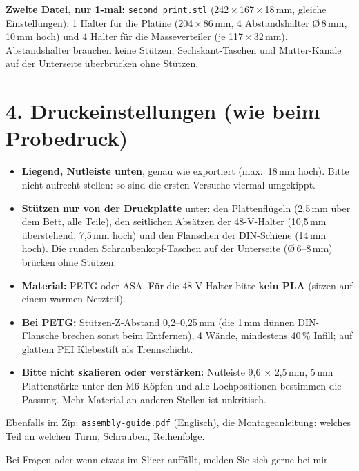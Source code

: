 \documentclass[10pt,a4paper]{article}
\begin{document}
\textbf{Zweite Datei, nur 1-mal:} \texttt{second\_print.stl} (242\,$\times$\,167\,$\times$\,18\,mm, gleiche Einstellungen):
1 Halter für die Platine (204\,$\times$\,86\,mm, 4 Abstandshalter Ø\,8\,mm, 10\,mm hoch) und 4 Halter für die Masseverteiler
(je 117\,$\times$\,32\,mm). Abstandshalter brauchen keine Stützen; Sechskant-Taschen und Mutter-Kanäle auf der Unterseite
überbrücken ohne Stützen.

\section*{4. Druckeinstellungen (wie beim Probedruck)}
\begin{itemize}
\item \textbf{Liegend, Nutleiste unten}, genau wie exportiert (max.\ 18\,mm hoch). Bitte nicht aufrecht stellen: so sind die
  ersten Versuche viermal umgekippt.
\item \textbf{Stützen nur von der Druckplatte} unter: den Plattenflügeln (2,5\,mm über dem Bett, alle Teile), den seitlichen
  Absätzen der 48-V-Halter (10,5\,mm überstehend, 7,5\,mm hoch) und den Flanschen der DIN-Schiene (14\,mm hoch). Die runden
  Schraubenkopf-Taschen auf der Unterseite (Ø\,6--8\,mm) brücken ohne Stützen.
\item \textbf{Material:} PETG oder ASA. Für die 48-V-Halter bitte \textbf{kein PLA} (sitzen auf einem warmen Netzteil).
\item \textbf{Bei PETG:} Stützen-Z-Abstand 0,2--0,25\,mm (die 1\,mm dünnen DIN-Flansche brechen sonst beim Entfernen),
  4 Wände, mindestens 40\,\% Infill; auf glattem PEI Klebestift als Trennschicht.
\item \textbf{Bitte nicht skalieren oder verstärken:} Nutleiste 9,6 $\times$ 2,5\,mm, 5\,mm Plattenstärke unter den
  M6-Köpfen und alle Lochpositionen bestimmen die Passung. Mehr Material an anderen Stellen ist unkritisch.
\end{itemize}

Ebenfalls im Zip: \texttt{assembly-guide.pdf} (Englisch), die Montageanleitung: welches Teil an welchen Turm, Schrauben, Reihenfolge.

Bei Fragen oder wenn etwas im Slicer auffällt, melden Sie sich gerne bei mir.
\end{document}

